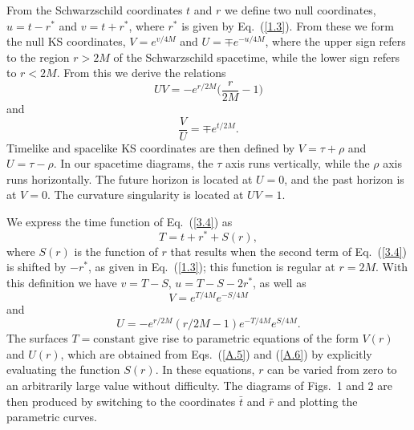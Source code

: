 From the Schwarzschild coordinates $t$ and $r$ we define two null  
coordinates, $u = t - r^*$ and $v = t + r^*$, where $r^*$ is given by 
Eq.~(\ref{1.3}). From these we form the null KS coordinates, $V =
e^{v/4M}$ and $U = \mp e^{-u/4M}$, where the upper sign refers to the
region $r > 2M$ of the Schwarzschild spacetime, while the lower sign
refers to $r < 2M$. From this we derive the relations
\begin{equation}
UV = -e^{r/2M} \biggl( \frac{r}{2M} -1 \biggr)
\label{A.2}
\end{equation}
and 
\begin{equation}
\frac{V}{U} = \mp e^{t/2M}. 
\label{A.3}
\end{equation}
Timelike and spacelike KS coordinates are then defined by $V =
\tau + \rho$ and $U = \tau - \rho$. In our spacetime
diagrams, the $\tau$ axis runs vertically, while the $\rho$ axis
runs horizontally. The future horizon is located at $U = 0$, and the
past horizon is at $V = 0$. The curvature singularity is located at
$UV = 1$.  

We express the time function of Eq.~(\ref{3.4}) as
\begin{equation}
T = t + r^* + S(r),
\label{A.4}
\end{equation}
where $S(r)$ is the function of $r$ that results when the second term
of Eq.~(\ref{3.4}) is shifted by $-r^*$, as given in
Eq.~(\ref{1.3}); this function is regular at $r=2M$. With this
definition we have $v = T-S$, $u = T-S-2r^*$, as well as   
\begin{equation}
V = e^{T/4M} e^{-S/4M}
\label{A.5}
\end{equation}
and
\begin{equation}
U = - e^{r/2M} (r/2M - 1) e^{-T/4M} e^{S/4M}. 
\label{A.6}
\end{equation}
The surfaces $T = \mbox{constant}$ give rise to parametric equations
of the form $V(r)$ and $U(r)$, which are obtained from
Eqs.~(\ref{A.5}) and (\ref{A.6}) by explicitly evaluating the function
$S(r)$. In these equations, $r$ can be varied from zero to an
arbitrarily large value without difficulty. The diagrams of Figs.~1
and 2 are then produced by switching to the coordinates $\bar{t}$ and
$\bar{r}$ and plotting the parametric curves.      

